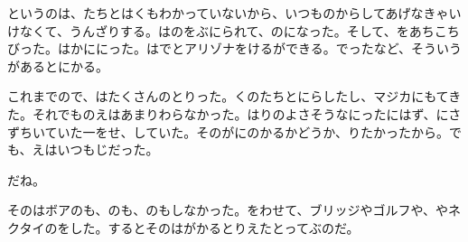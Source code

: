 というのは、たちとはくもわかっていないから、いつものからしてあげなきゃいけなくて、うんざりする。はのをぶにられて、のになった。そして、をあちこちびった。はかににった。はでとアリゾナをけるができる。でったなど、そういうがあるとにかる。

これまでので、はたくさんのとりった。くのたちとにらしたし、マジカにもてきた。それでものえはあまりわらなかった。はりのよさそうなにったにはず、にさずちいていた一をせ、していた。そのがにのかるかどうか、りたかったから。でも、えはいつもじだった。

だね。

そのはボアのも、のも、のもしなかった。をわせて、ブリッジやゴルフや、やネクタイのをした。するとそのはがかるとりえたとってぶのだ。
